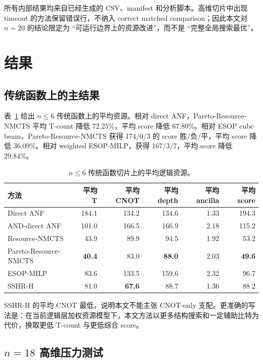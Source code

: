 \documentclass[UTF8,fontset=macnew,11pt]{ctexart}
\newcommand{\method}{Resource-NMCTS}
\newcommand{\pareto}{Pareto-Resource-NMCTS}
\begin{document}
所有内部结果均来自已经生成的 CSV、manifest 和分析脚本。高维切片中出现 timeout 的方法保留错误行，不纳入 correct matched comparison；因此本文对 $n=20$ 的结论限定为 ``可运行边界上的资源改进''，而不是 ``完整全局搜索最优''。

\section{结果}

\subsection{传统函数上的主结果}

表~\ref{tab:traditional} 给出 $n\leq6$ 传统函数上的平均资源。相对 direct ANF，\pareto{} 平均 T-count 降低 72.25\%，平均 score 降低 67.80\%。相对 ESOP cube beam，\pareto{} 获得 174/0/3 的 score 胜/负/平，平均 score 降低 36.09\%。相对 weighted ESOP-MILP，获得 167/3/7，平均 score 降低 29.84\%。

\begin{table}[t]
\centering
\small
\caption{$n\leq6$ 传统函数切片上的平均逻辑资源。}
\label{tab:traditional}
\begin{tabular}{lrrrrr}
\toprule
方法 & 平均 T & 平均 CNOT & 平均 depth & 平均 ancilla & 平均 score \\
\midrule
Direct ANF & 184.1 & 134.2 & 134.6 & 1.33 & 194.3 \\
AND-direct ANF & 101.0 & 166.5 & 166.9 & 2.18 & 115.2 \\
\method{} & 43.9 & 89.9 & 94.5 & 1.92 & 53.2 \\
\pareto{} & \textbf{40.4} & 83.0 & \textbf{88.0} & 2.03 & \textbf{49.6} \\
ESOP-MILP & 83.6 & 133.5 & 159.6 & 2.32 & 96.7 \\
SSHR-H & 81.0 & \textbf{67.6} & 88.7 & 1.36 & 88.2 \\
\bottomrule
\end{tabular}
\end{table}

SSHR-H 的平均 CNOT 最低，说明本文不能主张 CNOT-only 支配。更准确的写法是：在当前逻辑层加权资源模型下，本文方法以更多结构搜索和一定辅助比特为代价，换取更低 T-count 与更低综合 score。

\subsection{\texorpdfstring{$n=18$}{n=18} 高维压力测试}
\end{document}
